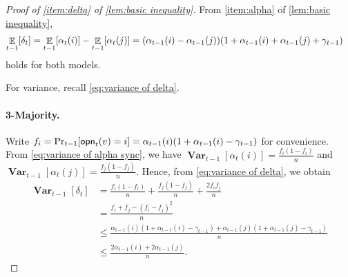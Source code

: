 \documentclass[letterpaper,11pt]{article}
\DeclarePairedDelimiter{\rbra}{\lparen}{\rparen} %
\DeclarePairedDelimiter{\sbra}{\lbrack}{\rbrack} %
\DeclareMathOperator*{\E}{\mathbb{E}}
\DeclareMathOperator*{\Var}{\mathbf{Var}}
\newcommand{\alphanorm}{\gamma}
\newcommand{\opinion}{\mathsf{opn}}
\begin{document}
\begin{proof}[Proof of \cref{item:delta} of \cref{lem:basic inequality}]
   From \cref{item:alpha} of \cref{lem:basic inequality}, 
    \begin{align*}
        \E_{t-1}[\delta_{t}]&=\E_{t-1}[\alpha_t(i)]-\E_{t-1}[\alpha_t(j)]
        =(\alpha_{t-1}(i)-\alpha_{t-1}(j))\rbra*{1+\alpha_{t-1}(i)+\alpha_{t-1}(j)+\alphanorm_{t-1}}
    \end{align*}
    holds for both models.

    For variance, recall \cref{eq:variance of delta}.
    \paragraph*{3-Majority.}
    Write $f_i=\Pr_{t-1}\sbra*{\opinion_t(v)=i}=\alpha_{t-1}(i)(1+\alpha_{t-1}(i)-\alphanorm_{t-1})$ for convenience.
    From \cref{eq:variance of alpha sync}, we have $\Var_{t-1}[\alpha_t(i)]=\frac{f_i(1-f_i)}{n}$ and $\Var_{t-1}[\alpha_t(j)]=\frac{f_j(1-f_j)}{n}$. 
    Hence, from \cref{eq:variance of delta}, we obtain
    \begin{align*}
        \Var_{t-1}[\delta_t]
        &=\frac{f_i(1-f_i)}{n}+\frac{f_j(1-f_j)}{n}+\frac{2f_if_j}{n}\\
        &=\frac{f_i+f_j-(f_i-f_j)^2}{n}\\
        &\leq \frac{\alpha_{t-1}(i)(1+\alpha_{t-1}(i)-\alphanorm_{t-1})+\alpha_{t-1}(j)(1+\alpha_{t-1}(j)-\alphanorm_{t-1})}{n}\\
        &\leq \frac{2\alpha_{t-1}(i)+2\alpha_{t-1}(j)}{n}.
    \end{align*}

\end{proof}
\end{document}
